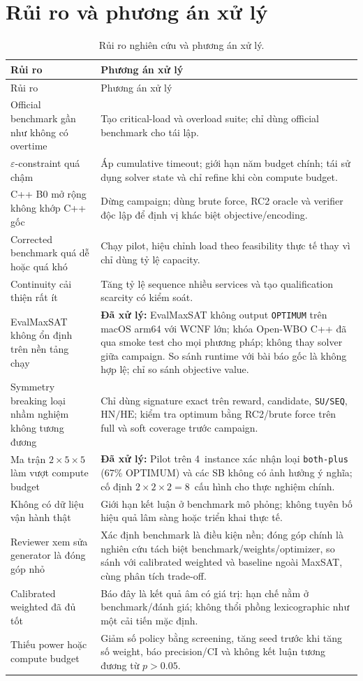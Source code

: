 \documentclass[12pt,a4paper]{article}
\newcommand{\HN}{\mathrm{HN}}
\newcommand{\HE}{\mathrm{HE}}
\begin{document}
\section{Rủi ro và phương án xử lý}

\begin{longtable}{@{}p{}p{}@{}}
\caption{Rủi ro nghiên cứu và phương án xử lý.}\\
\toprule
Rủi ro & Phương án xử lý \\
\midrule
\endfirsthead
\toprule
Rủi ro & Phương án xử lý \\
\midrule
\endhead
Official benchmark gần như không có overtime & Tạo critical-load và overload
suite; chỉ dùng official benchmark cho tái lập. \\
$\varepsilon$-constraint quá chậm & Áp cumulative timeout; giới hạn năm budget
chính; tái sử dụng solver state và chỉ refine khi còn compute budget. \\
C++ B0 mở rộng không khớp C++ gốc & Dừng campaign; dùng brute force, RC2 oracle
và verifier độc lập để định vị khác biệt objective/encoding. \\
Corrected benchmark quá dễ hoặc quá khó & Chạy pilot, hiệu chỉnh load theo
feasibility thực tế thay vì chỉ dùng tỷ lệ capacity. \\
Continuity cải thiện rất ít & Tăng tỷ lệ sequence nhiều services và tạo
qualification scarcity có kiểm soát. \\
EvalMaxSAT không ổn định trên nền tảng chạy & \textbf{Đã xử lý:} EvalMaxSAT
không output \texttt{OPTIMUM} trên macOS arm64 với WCNF lớn; khóa
Open-WBO C++ đã qua smoke test cho mọi phương pháp; không thay solver giữa
campaign. So sánh runtime với bài báo gốc là không hợp lệ; chỉ so sánh
objective value. \\
Symmetry breaking loại nhầm nghiệm không tương đương & Chỉ dùng signature exact
trên reward, candidate, \texttt{SU/SEQ}, $\HN/\HE$; kiểm tra optimum bằng RC2/brute force
trên full và soft coverage trước campaign. \\
Ma trận $2\times5\times5$ làm vượt compute budget & \textbf{Đã xử lý:} Pilot trên
4~instance xác nhận loại \texttt{both-plus} (67\% OPTIMUM) và các SB
không có ảnh hưởng ý nghĩa; cố định $2\times2\times2=8$~cấu hình
cho thực nghiệm chính. \\
Không có dữ liệu vận hành thật & Giới hạn kết luận ở benchmark mô phỏng; không
tuyên bố hiệu quả lâm sàng hoặc triển khai thực tế. \\
Reviewer xem sửa generator là đóng góp nhỏ & Xác định benchmark là điều kiện
nền; đóng góp chính là nghiên cứu tách biệt benchmark/weights/optimizer, so sánh
với calibrated weighted và baseline ngoài MaxSAT, cùng phân tích trade-off. \\
Calibrated weighted đã đủ tốt & Báo đây là kết quả âm có giá trị: hạn chế nằm ở
benchmark/đánh giá; không thổi phồng lexicographic như một cải tiến mặc định. \\
Thiếu power hoặc compute budget & Giảm số policy bằng screening, tăng seed trước
khi tăng số weight, báo precision/CI và không kết luận tương đương từ $p>0.05$. \\
\bottomrule
\end{longtable}
\end{document}
